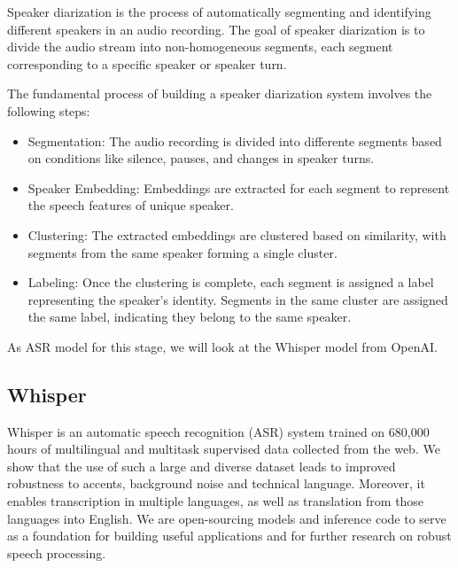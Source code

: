 \documentclass[PMI,VKR]{HSEUniversity}
\begin{document}
Speaker diarization is the process of automatically segmenting and identifying different speakers in an audio recording. 
The goal of speaker diarization is to divide the audio stream into non-homogeneous segments, each segment corresponding to a specific speaker or speaker turn.

The fundamental process of building a speaker diarization system involves the following steps:

\begin{itemize}
    \item Segmentation: The audio recording is divided into differente segments based on conditions like silence, pauses, and changes in speaker turns.
    \item Speaker Embedding: Embeddings are extracted for each segment to represent the speech features of unique speaker.
    \item Clustering: The extracted embeddings are clustered based on similarity, with segments from the same speaker forming a single cluster.
    \item Labeling: Once the clustering is complete, each segment is assigned a label representing the speaker's identity. Segments in the same cluster are assigned the same label, indicating they belong to the same speaker.
\end{itemize}

As ASR model for this stage, we will look at the Whisper \cite{whisper:2022} model from OpenAI.

\subsection{Whisper}

Whisper is an automatic speech recognition (ASR) system trained on 680,000 hours of multilingual and multitask supervised data collected from the web. 
We show that the use of such a large and diverse dataset leads to improved robustness to accents, background noise and technical language. Moreover, it enables transcription in multiple languages, as well as translation from those languages into English. 
We are open-sourcing models and inference code to serve as a foundation for building useful applications and for further research on robust speech processing.
\end{document}

